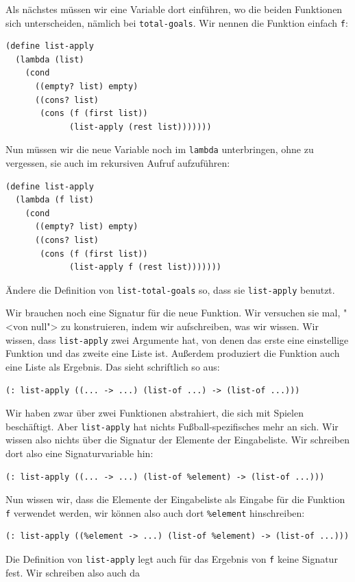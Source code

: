 Als nächstes müssen wir eine Variable dort einführen, wo die beiden
Funktionen sich unterscheiden, nämlich bei \lstinline{total-goals}.
Wir nennen die Funktion einfach \lstinline{f}:
%
\begin{lstlisting}
(define list-apply
  (lambda (list)
    (cond
      ((empty? list) empty)
      ((cons? list)
       (cons (f (first list))
             (list-apply (rest list)))))))  
\end{lstlisting}
%
Nun müssen wir die neue Variable noch im \lstinline{lambda}
unterbringen, ohne zu vergessen, sie auch im rekursiven Aufruf
aufzuführen:
%
\begin{lstlisting}
(define list-apply
  (lambda (f list)
    (cond
      ((empty? list) empty)
      ((cons? list)
       (cons (f (first list))
             (list-apply f (rest list)))))))
\end{lstlisting}
%
\begin{aufgabeinline}
  Ändere die Definition von \lstinline{list-total-goals} so, dass sie
  \lstinline{list-apply} benutzt.
\end{aufgabeinline}
%
Wir brauchen noch eine Signatur für die neue Funktion.  Wir versuchen
sie mal, "<von null"> zu konstruieren, indem wir aufschreiben, was wir
wissen.  Wir wissen, dass \lstinline{list-apply} zwei Argumente hat,
von denen das erste eine einstellige Funktion und das zweite eine
Liste ist.  Außerdem produziert die Funktion auch eine Liste als
Ergebnis.  Das sieht schriftlich so aus:
%
\begin{lstlisting}
(: list-apply ((... -> ...) (list-of ...) -> (list-of ...)))
\end{lstlisting}
%
Wir haben zwar über zwei Funktionen abstrahiert, die sich mit Spielen
beschäftigt.  Aber \lstinline{list-apply} hat nichts
Fußball-spezifisches mehr an sich.  Wir wissen also nichts über die
Signatur der Elemente der Eingabeliste.  Wir schreiben dort also eine
Signaturvariable hin:
%
\begin{lstlisting}
(: list-apply ((... -> ...) (list-of %element) -> (list-of ...)))
\end{lstlisting}
%
Nun wissen wir, dass die Elemente der Eingabeliste als Eingabe für die
Funktion \lstinline{f} verwendet werden, wir können also auch dort
\lstinline{%element} hinschreiben:
%
\begin{lstlisting}
(: list-apply ((%element -> ...) (list-of %element) -> (list-of ...)))
\end{lstlisting}
%
Die Definition von \lstinline{list-apply} legt auch für das Ergebnis
von  \lstinline{f} keine Signatur fest.  Wir schreiben also auch da
